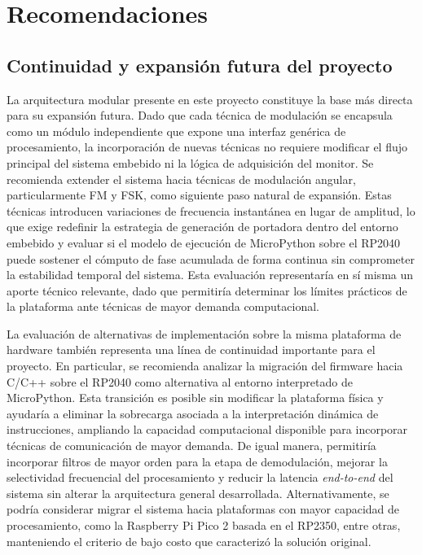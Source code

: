 \section{Recomendaciones}

\subsection{Continuidad y expansión futura del proyecto}

La arquitectura modular presente en este proyecto constituye la base más directa para su expansión futura. Dado que cada técnica de modulación se encapsula como un módulo independiente que expone una interfaz genérica de procesamiento, la incorporación de nuevas técnicas no requiere modificar el flujo principal del sistema embebido ni la lógica de adquisición del monitor. Se recomienda extender el sistema hacia técnicas de modulación angular, particularmente FM y FSK, como siguiente paso natural de expansión. Estas técnicas introducen variaciones de frecuencia instantánea en lugar de amplitud, lo que exige redefinir la estrategia de generación de portadora dentro del entorno embebido y evaluar si el modelo de ejecución de MicroPython sobre el RP2040 puede sostener el cómputo de fase acumulada de forma continua sin comprometer la estabilidad temporal del sistema. Esta evaluación representaría en sí misma un aporte técnico relevante, dado que permitiría determinar los límites prácticos de la plataforma ante técnicas de mayor demanda computacional.

La evaluación de alternativas de implementación sobre la misma plataforma de hardware también representa una línea de continuidad importante para el proyecto. En particular, se recomienda analizar la migración del firmware hacia C/C++ sobre el RP2040 como alternativa al entorno interpretado de MicroPython. Esta transición es posible sin modificar la plataforma física y ayudaría a eliminar la sobrecarga asociada a la interpretación dinámica de instrucciones, ampliando la capacidad computacional disponible para incorporar técnicas de comunicación de mayor demanda. De igual manera, permitiría incorporar filtros de mayor orden para la etapa de demodulación, mejorar la selectividad frecuencial del procesamiento y reducir la latencia \textit{end-to-end} del sistema sin alterar la arquitectura general desarrollada. Alternativamente, se podría considerar migrar el sistema hacia plataformas con mayor capacidad de procesamiento, como la Raspberry Pi Pico 2 basada en el RP2350, entre otras, manteniendo el criterio de bajo costo que caracterizó la solución original.

